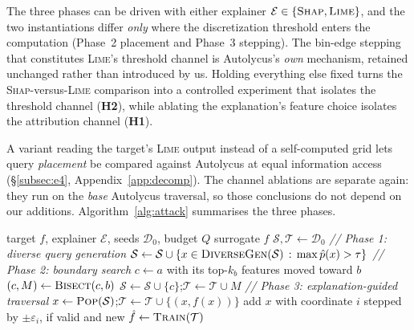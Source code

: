 \documentclass[sigconf,anonymous,review]{acmart}
\begin{document}
The three phases can be driven with either explainer $\mathcal{E} \in \{\textsc{Shap},
\textsc{Lime}\}$, and the two instantiations differ \emph{only} where the discretization threshold
enters the computation (Phase~2 placement and Phase~3 stepping). The bin-edge stepping that
constitutes \textsc{Lime}'s threshold channel is Autolycus's \emph{own} mechanism, retained unchanged
rather than introduced by us. Holding everything else fixed turns the
\textsc{Shap}-versus-\textsc{Lime} comparison into a controlled experiment that isolates the threshold
channel (\textbf{H2}), while ablating the explanation's feature choice isolates the attribution
channel (\textbf{H1}).

A variant reading the target's \textsc{Lime} output instead of a self-computed grid lets query
\emph{placement} be compared against Autolycus at equal information access
(\S\ref{subsec:e4}, Appendix~\ref{app:decomp}). The channel ablations are separate again: they run on
the \emph{base} Autolycus traversal, so those conclusions do not depend on our additions.
Algorithm~\ref{alg:attack} summarises the three phases.

\begin{algorithm}[t]
\caption{Boundary-directed extraction with explainer
$\mathcal{E}\in\{\textsc{Shap},\textsc{Lime}\}$. Parameter values are given in
\S\ref{subsec:diverse}--\ref{subsec:traversal}.}
\label{alg:attack}
\begin{algorithmic}[1]
\Require target $f$, explainer $\mathcal{E}$, seeds $\mathcal{D}_0$, budget $Q$
\Ensure surrogate $\hat{f}$
\State $\mathcal{S}, \mathcal{T} \gets \mathcal{D}_0$
\Statex \textit{// Phase 1: diverse query generation}
\State $\mathcal{S} \gets \mathcal{S} \cup
       \{x \in \textsc{DiverseGen}(\mathcal{S}) \,:\, \max \hat{p}(x) > \tau\}$
\Statex \textit{// Phase 2: boundary search}
  \State $c \gets a$ with its top-$k_b$ features moved toward $b$
  \State $(c, M) \gets \textsc{Bisect}(c, b)$ 
  \State $\mathcal{S} \gets \mathcal{S} \cup \{c\}$;\quad $\mathcal{T} \gets \mathcal{T} \cup M$
\EndFor
\Statex \textit{// Phase 3: explanation-guided traversal}
  \State $x \gets \textsc{Pop}(\mathcal{S})$;\quad $\mathcal{T} \gets \mathcal{T} \cup \{(x, f(x))\}$
     \State add $x$ with coordinate $i$ stepped by $\pm\varepsilon_i$, if valid and new
  \EndFor
\EndWhile
\State \Return $\hat{f} \gets \textsc{Train}(\mathcal{T})$
\end{algorithmic}
\end{algorithm}
\end{document}
